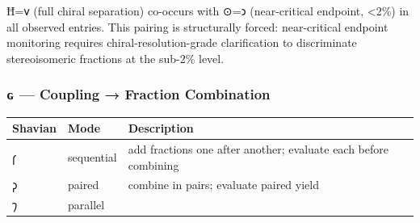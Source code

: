 Ħ=𐑫 (full chiral separation) co-occurs with ⊙=𐑮 (near-critical endpoint,
\textless2\%) in all observed entries. This pairing is structurally
forced: near-critical endpoint monitoring requires
chiral-resolution-grade clarification to discriminate stereoisomeric
fractions at the sub-2\% level.

\hypertarget{ux262-coupling-fraction-combination}{%
\subsubsection{ɢ --- Coupling → Fraction
Combination}\label{ux262-coupling-fraction-combination}}

\begin{longtable}[]{@{}lll@{}}
\toprule
\begin{minipage}[b]{0.30\columnwidth}\raggedright
Shavian\strut
\end{minipage} & \begin{minipage}[b]{0.30\columnwidth}\raggedright
Mode\strut
\end{minipage} & \begin{minipage}[b]{0.30\columnwidth}\raggedright
Description\strut
\end{minipage}\tabularnewline
\midrule
\endhead
\begin{minipage}[t]{0.30\columnwidth}\raggedright
𐑝\strut
\end{minipage} & \begin{minipage}[t]{0.30\columnwidth}\raggedright
sequential\strut
\end{minipage} & \begin{minipage}[t]{0.30\columnwidth}\raggedright
add fractions one after another; evaluate each before combining\strut
\end{minipage}\tabularnewline
\begin{minipage}[t]{0.30\columnwidth}\raggedright
𐑜\strut
\end{minipage} & \begin{minipage}[t]{0.30\columnwidth}\raggedright
paired\strut
\end{minipage} & \begin{minipage}[t]{0.30\columnwidth}\raggedright
combine in pairs; evaluate paired yield\strut
\end{minipage}\tabularnewline
\begin{minipage}[t]{0.30\columnwidth}\raggedright
𐑠\strut
\end{minipage} & \begin{minipage}[t]{0.30\columnwidth}\raggedright
parallel\strut

\end{minipage}
\end{longtable}
